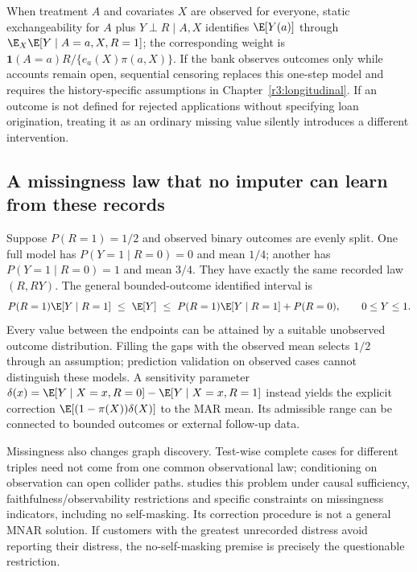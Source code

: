 When treatment $A$ and covariates $X$ are observed for everyone, static
exchangeability for $A$ plus $Y\perp R\mid A,X$ identifies
$\E[Y(a)]$ through $\E_X\E[Y\mid A=a,X,R=1]$; the corresponding
weight is $\mathbf1(A=a)R/\{e_a(X)\pi(a,X)\}$.
If the bank observes outcomes only while accounts remain open,
sequential censoring replaces this one-step model and requires the
history-specific assumptions in Chapter~\ref{r3:longitudinal}.
If an outcome is not defined for rejected applications without
specifying loan origination, treating it as an ordinary missing value
silently introduces a different intervention.

\subsection{A missingness law that no imputer can learn from these records}
Suppose $P(R=1)=1/2$ and observed binary outcomes are evenly split.
One full model has $P(Y=1\mid R=0)=0$ and mean $1/4$; another has
$P(Y=1\mid R=0)=1$ and mean $3/4$. They have exactly the same
recorded law $(R,RY)$. The general bounded-outcome identified interval is
\[
 P(R=1)\E[Y\mid R=1]
 \ \le\ \E[Y]\ \le\
 P(R=1)\E[Y\mid R=1]+P(R=0),\qquad 0\le Y\le1.
\]
Every value between the endpoints can be attained by a suitable
unobserved outcome distribution. Filling the gaps with the observed
mean selects $1/2$ through an assumption; prediction validation on
observed cases cannot distinguish these models. A sensitivity parameter
$\delta(x)=\E[Y\mid X=x,R=0]-\E[Y\mid X=x,R=1]$ instead yields
the explicit correction $\E[(1-\pi(X))\delta(X)]$ to the MAR mean.
Its admissible range can be connected to bounded outcomes or external
follow-up data.

Missingness also changes graph discovery. Test-wise complete cases for
different triples need not come from one common observational law;
conditioning on observation can open collider paths.
\citet[Section 3, Assumptions 1--4]{tu2019} studies this problem under
causal sufficiency, faithfulness/observability restrictions and specific
constraints on missingness indicators, including no self-masking.
Its correction procedure is not a general MNAR solution. If customers
with the greatest unrecorded distress avoid reporting their distress,
the no-self-masking premise is precisely the questionable restriction.

